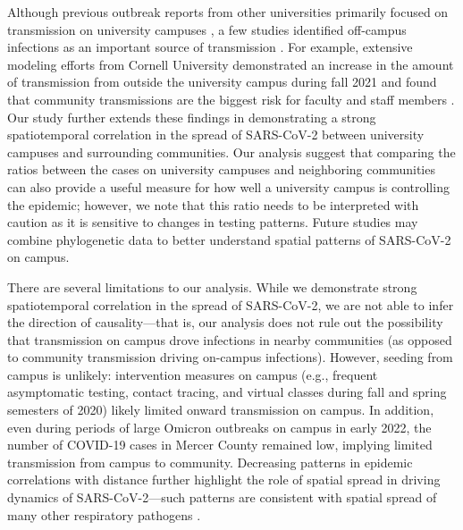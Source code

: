 \documentclass[12pt]{article}
\begin{document}
Although previous outbreak reports from other universities primarily focused on transmission on university campuses \citep{wilson2020multiple,currie2021interventions}, a few studies identified off-campus infections as an important source of transmission \citep{fox2021response,hamer2021assessment}.
For example, extensive modeling efforts from Cornell University demonstrated an increase in the amount of transmission from outside the university campus during fall 2021 and found that community transmissions are the biggest risk for faculty and staff members \citep{frazier2022modeling}.
Our study further extends these findings in demonstrating a strong spatiotemporal correlation in the spread of SARS-CoV-2 between university campuses and surrounding communities.
Our analysis suggest that comparing the ratios between the cases on university campuses and neighboring communities can also provide a useful measure for how well a university campus is controlling the epidemic; 
however, we note that this ratio needs to be interpreted with caution as it is sensitive to changes in testing patterns.
Future studies may combine phylogenetic data to better understand spatial patterns of SARS-CoV-2 on campus.

There are several limitations to our analysis.
While we demonstrate strong spatiotemporal correlation in the spread of SARS-CoV-2, we are not able to infer the direction of causality---that is, our analysis does not rule out the possibility that transmission on campus drove infections in nearby communities (as opposed to community transmission driving on-campus infections).
However, seeding from campus is unlikely: 
intervention measures on campus (e.g., frequent asymptomatic testing, contact tracing, and virtual classes during fall and spring semesters of 2020) likely limited onward transmission on campus.
In addition, even during periods of large Omicron outbreaks on campus in early 2022, the number of COVID-19 cases in Mercer County remained low, implying limited transmission from campus to community.
Decreasing patterns in epidemic correlations with distance further highlight the role of spatial spread in driving dynamics of SARS-CoV-2---such patterns are consistent with spatial spread of many other respiratory pathogens \citep{grenfell2001travelling, viboud2006synchrony, baker2019epidemic}.
\end{document}
